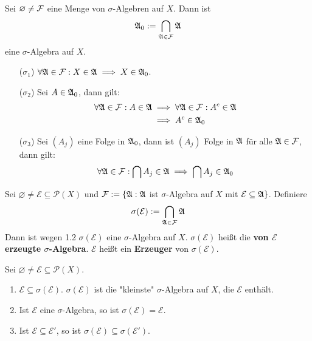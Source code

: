 \documentclass[a4paper,twoside,DIV15,BCOR12mm,chapterprefix=true,headings=onelinechapter]{scrbook}
\begin{document}
\begin{lemma}
\label{Lemma 1.2}
Sei $\varnothing\ne\mathcal{F}$ eine Menge von $\sigma$-Algebren auf $X$. Dann ist 
\[\mathfrak{A}_0:=\bigcap_{\mathfrak{A}\in\mathcal{F}}\mathfrak{A}\]
eine $\sigma$-Algebra auf $X$.
\end{lemma}

\begin{beweis}
\begin{enumerate}
\item[($\sigma_1$)] $\forall\mathfrak{A}\in\mathcal{F}:X\in\mathfrak{A}\implies X\in\mathfrak{A}_0$.
\item[($\sigma_2$)] Sei $A\in\mathfrak{A}_0$, dann gilt:
\begin{align*}
\forall\mathfrak{A}\in\mathcal{F}:A\in\mathfrak{A} &\implies \forall\mathfrak{A}\in\mathcal{F}:A^c\in\mathfrak{A}\\
&\implies A^c\in\mathfrak{A}_0
\end{align*}
\item[($\sigma_3$)] Sei $(A_j)$ eine Folge in $\mathfrak{A}_0$, dann ist $(A_j)$ Folge in $\mathfrak{A}$ für alle $\mathfrak{A}\in\mathcal{F}$, dann gilt:
\begin{align*}
\forall\mathfrak{A}\in\mathcal{F}:\bigcap A_j\in\mathfrak{A} \implies \bigcap A_j\in\mathfrak{A}_0
\end{align*}
\end{enumerate}
\end{beweis}

\begin{definition}
Sei $\varnothing\ne\mathcal{E}\subseteq\mathcal{P}(X)$ und $\mathcal{F}:=\{\mathfrak{A}:\mathfrak{A}$ ist $\sigma$-Algebra auf $X$ mit $\mathcal{E}\subseteq\mathfrak{A}\}$. Definiere
\[\sigma(\mathcal{E}):=\bigcap_{\mathfrak{A}\in\mathcal{F}}\mathfrak{A}\]
Dann ist wegen 1.2 $\sigma(\mathcal{E})$ eine $\sigma$-Algebra auf $X$. $\sigma(\mathcal{E})$ heißt die \textbf{von $\mathcal{E}$ erzeugte $\sigma$-Algebra}. $\mathcal{E}$ heißt ein \textbf{Erzeuger} von $\sigma(\mathcal{E})$.
\end{definition}

\begin{lemma}
\label{Lemma 1.3}
Sei $\varnothing\ne\mathcal{E}\subseteq\mathcal{P}(X)$.
\begin{enumerate}
\item $\mathcal{E}\subseteq\sigma(\mathcal{E})$. $\sigma(\mathcal{E})$ ist die "kleinste" $\sigma$-Algebra auf $X$, die $\mathcal{E}$ enthält.
\item Ist $\mathcal{E}$ eine $\sigma$-Algebra, so ist $\sigma(\mathcal{E})=\mathcal{E}$.
\item Ist $\mathcal{E}\subseteq\mathcal{E}'$, so ist $\sigma(\mathcal{E})\subseteq\sigma(\mathcal{E}')$.
\end{enumerate}
\end{lemma}
\end{document}
